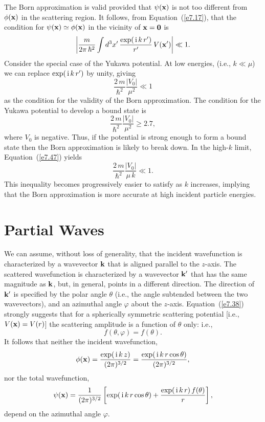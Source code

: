 The Born approximation is valid provided that $\psi({\bf x})$ is
not too different from $\phi({\bf x})$ in the scattering region. 
It follows, from Equation~(\ref{e7.17}), that the condition for  $\psi({\bf x})
\simeq \phi({\bf x})$ in the vicinity of ${\bf x} = {\bf 0}$ is 
\begin{equation}\label{e7.47}
\left| \frac{m}{2\pi\, \hbar^2} \int d^3  x'\,\frac{ \exp(\,{\rm i}\, k \,r')}{r'} 
\,V({\bf x}') \right| \ll 1.
\end{equation}
 Consider the special case of the Yukawa potential. At low energies,
({\rm i.e.}, $k\ll \mu$) we can replace $\exp(\,{\rm i}\,k\, r')$ by unity,
giving
\begin{equation}
\frac{2\,m}{\hbar^2} \frac{|V_0|}{\mu^2} \ll 1
\end{equation}
as the condition for the validity of the Born approximation.
The condition for the Yukawa potential to develop a bound state
is
\begin{equation}
\frac{2\,m}{\hbar^2} \frac{|V_0|} {\mu^2} \geq 2.7,
\end{equation}
where $V_0$ is negative. Thus, if the potential is strong enough to
form a bound state then the Born approximation is likely to break
down. In the high-$k$ limit, Equation~(\ref{e7.47}) yields
\begin{equation}
\frac{2\,m}{\hbar^2} \frac{|V_0|}{\mu \,k} \ll 1.
\end{equation}
This inequality becomes progressively easier to satisfy as $k$ increases,
implying that the Born approximation is more accurate at high
incident particle energies.

\section{Partial Waves}
We can assume, without loss of generality, that the incident wavefunction
is characterized by  a wavevector ${\bf k}$ that  is aligned parallel to the $z$-axis.
The scattered wavefunction is characterized by a wavevector ${\bf k}'$
that has the same magnitude as ${\bf k}$, but, in general, points
in a different direction. The direction of ${\bf k}'$ is specified
by the polar angle $\theta$ ({\rm i.e.}, the angle subtended between the
two wavevectors), and an azimuthal angle $\varphi$ about the $z$-axis.
Equation~(\ref{e7.38}) strongly suggests that for a spherically symmetric
scattering potential [{\rm i.e.}, $V({\bf x}) = V(r)$] the scattering amplitude
is a function of $\theta$ only: i.e., 
\begin{equation}
f(\theta, \varphi) = f(\theta).
\end{equation}
It follows that neither the incident wavefunction,
\begin{equation}\label{e7.52}
\phi({\bf x}) = \frac{\exp(\,{\rm i}\,k\,z)}{(2\pi)^{3/2}}= \frac{\exp(\,{\rm i}\,k\,r\cos\theta)}{(2\pi)^{3/2}},
\end{equation}
nor the total wavefunction,
\begin{equation}\label{e7.53}
\psi({\bf x})  = \frac{1}{(2\pi)^{3/2}}
\left[ \exp(\,{\rm i}\,k\,r\cos\theta) + \frac{\exp(\,{\rm i}\,k\,r)\, f(\theta)}
{r} \right],
\end{equation}
depend on the azimuthal angle $\varphi$. 

